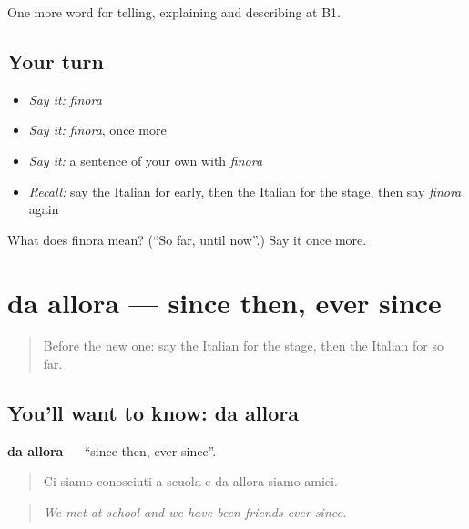 \begin{grammarlens}[title={What you've built}]
One more word for telling, explaining and describing at B1.
\end{grammarlens}

\subsection*{Your turn}
\begin{itemize}
\raggedright
  \item \emph{Say it:} \emph{finora}
  \item \emph{Say it:} \emph{finora}, once more
  \item \emph{Say it:} a sentence of your own with \emph{finora}
  \item \emph{Recall:} say the Italian for early, then the Italian for the stage, then say \emph{finora} again
\end{itemize}

\begin{tcolorbox}[breakable,colback=teal!4,colframe=teal!35!black,title={Before you move on}]
What does finora mean? (\textquotedblleft{}So far, until now\textquotedblright{}.) Say it once more.
\end{tcolorbox}
\section[da allora]{da allora — since then, ever since}

\label{lesson:IT-C280-da-allora}



\begin{quote}
Before the new one: say the Italian for the stage, then the Italian for so far.
\end{quote}

\subsection*{You'll want to know: da allora}
\textbf{da allora} — \textquotedblleft{}since then, ever since\textquotedblright{}.

\begin{quote}
Ci siamo conosciuti a scuola e da allora siamo amici.
\end{quote}

\begin{quote}
\emph{We met at school and we have been friends ever since.}
\end{quote}

